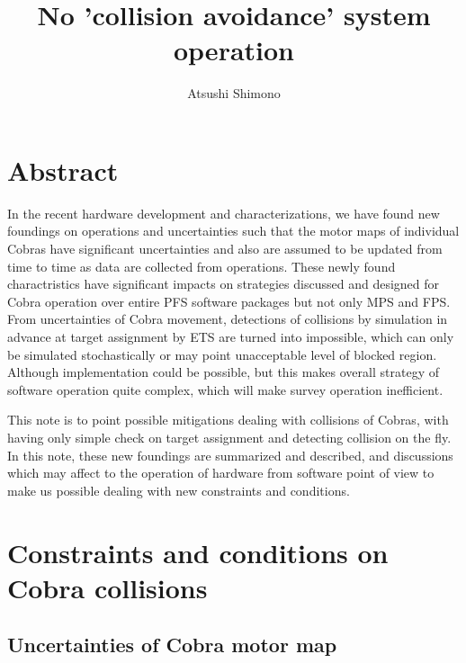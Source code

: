 \documentclass[a4paper,notitlepage]{article}
\title{No 'collision avoidance' system operation}
\author{Atsushi Shimono}
\begin{document}
\drafttrue
{}
\SSNChangeRecord{
}

\ssnhead

\section{Abstract}

In the recent hardware development and characterizations, we have found 
new foundings on operations and uncertainties such that 
the motor maps of individual Cobras have significant uncertainties and 
also are assumed to be updated from time to time as data are collected from 
operations. 
These newly found charactristics have significant impacts on strategies 
discussed and designed for Cobra operation over entire PFS software packages 
but not only MPS and FPS. 
From uncertainties of Cobra movement, detections of collisions by simulation 
in advance at target assignment by ETS are turned into impossible, which 
can only be simulated stochastically or may point unacceptable level of 
blocked region. 
Although implementation could be possible, but this makes overall strategy 
of software operation quite complex, which will make survey operation 
inefficient. 

This note is to point possible mitigations dealing with collisions of 
Cobras, with having only simple check on target assignment and detecting 
collision on the fly. 
In this note, these new foundings are summarized and described, and 
discussions which may affect to the operation of hardware from software 
point of view to make us possible dealing with new constraints and conditions. 

\section{Constraints and conditions on Cobra collisions}

\subsection{Uncertainties of Cobra motor map}
\end{document}
